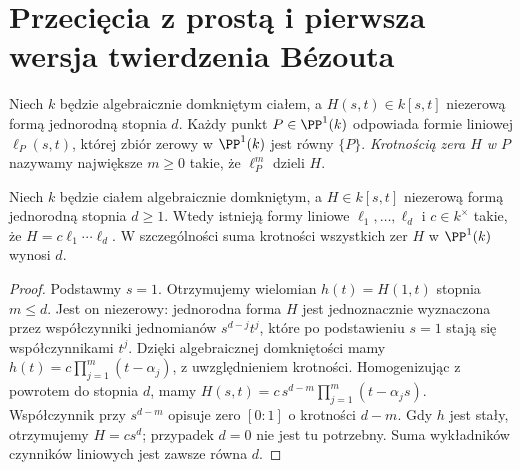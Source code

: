 \section{Przecięcia z prostą i pierwsza wersja twierdzenia Bézouta}

\begin{definicja}
Niech $k$ będzie algebraicznie domkniętym ciałem,
a $H(s,t)\in k[s,t]$ niezerową formą jednorodną stopnia $d$.
Każdy punkt $P\in\PP^1(k)$ odpowiada formie liniowej
$\ell_P(s,t)$, której zbiór zerowy w $\PP^1(k)$ jest
równy $\{P\}$. \emph{Krotnością zera $H$ w $P$} nazywamy
największe $m\ge0$ takie, że $\ell_P^m$ dzieli $H$.
\end{definicja}

\begin{lemat}
Niech $k$ będzie ciałem algebraicznie domkniętym,
a $H\in k[s,t]$ niezerową formą jednorodną stopnia $d\ge1$.
Wtedy istnieją formy liniowe $\ell_1,\ldots,\ell_d$
i $c\in k^\times$ takie, że $H=c\ell_1\cdots\ell_d$.
W szczególności suma krotności wszystkich zer $H$ w $\PP^1(k)$
wynosi $d$.
\end{lemat}
\begin{proof}
Podstawmy $s=1$. Otrzymujemy wielomian
$h(t)=H(1,t)$ stopnia $m\le d$. Jest on niezerowy:
jednorodna forma $H$ jest jednoznacznie wyznaczona przez
współczynniki jednomianów $s^{d-j}t^j$, które po
podstawieniu $s=1$ stają się współczynnikami $t^j$.
Dzięki algebraicznej domkniętości mamy
$h(t)=c\prod_{j=1}^m(t-\alpha_j)$, z uwzględnieniem krotności.
Homogenizując z powrotem do stopnia $d$, mamy
$H(s,t)=c\,s^{d-m}\prod_{j=1}^m(t-\alpha_js)$.
Współczynnik przy $s^{d-m}$ opisuje zero $[0:1]$
o krotności $d-m$. Gdy $h$ jest stały, otrzymujemy
$H=cs^d$; przypadek $d=0$ nie jest tu potrzebny.
Suma wykładników czynników liniowych jest zawsze równa $d$.
\end{proof}

